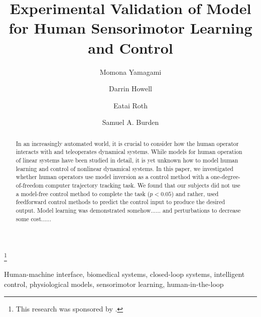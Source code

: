 \documentclass{ifacconf}
\begin{document}
\begin{frontmatter}

\title{Experimental Validation of Model for Human Sensorimotor Learning and Control} 

\thanks[footnoteinfo]{This research was sponsored by .}

\author[First]{Momona Yamagami} 
\author[Second]{Darrin Howell} 
\author[Third]{Eatai Roth}
\author[Fourth]{Samuel A. Burden}

\address[First]{Department of Electrical Engineering, University of Washington, Seattle, 
   Seattle, WA 98105 USA (e-mail: my13@ uw.edu).}
\address[Second]{Department of Mechanical Engineering,University of Washington, Seattle, 
   Seattle, WA 98105 USA}
\address[Third]{Department of Intelligent Systems Engineering, Indiana University, 
   Bloomington, IN USA}
\address[Fourth]{Department of Electrical Engineering, University of Washington, Seattle, 
   Seattle, WA 98105 USA (e-mail: sburden@ uw.edu).}

\begin{abstract}                %
In an increasingly automated world, it is crucial to consider how the human operator interacts with and teleoperates dynamical systems. While models for human operation of linear systems have been studied in detail, it is yet unknown how to model human learning and control of nonlinear dynamical systems. In this paper, we investigated whether human operators use model inversion as a control method with a one-degree-of-freedom computer trajectory tracking task. We found that our subjects did not use a model-free control method to complete the task ($p < 0.05$) and rather, used feedforward control methods to predict the control input to produce the desired output. Model learning was demonstrated somehow...... and perturbations to decrease some cost...... 
\end{abstract}

\begin{keyword}
Human-machine interface, biomedical systems, closed-loop systems, intelligent control, physiological models, sensorimotor learning, human-in-the-loop
\end{keyword}

\end{frontmatter}
\end{document}
